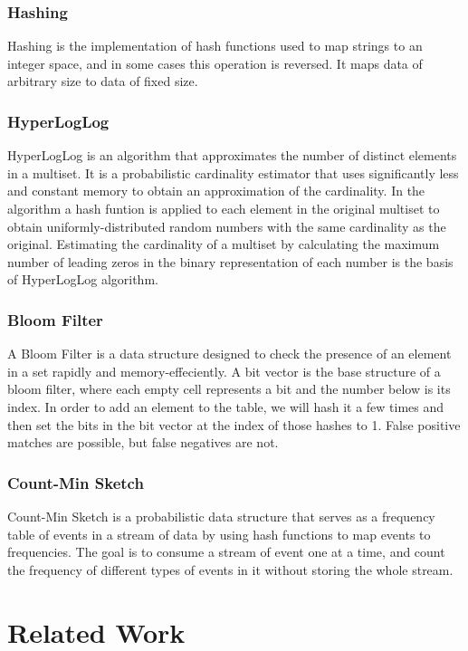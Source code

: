 \documentclass[preprint,nocopyrightspace]{sig-alternate}
\begin{document}
\subsubsection{Hashing}
Hashing is the implementation of hash functions used to map strings to an integer space, and in some cases this operation is reversed. It maps data of arbitrary size to data of fixed size.

\subsubsection{HyperLogLog}
HyperLogLog is an algorithm that approximates the number of distinct elements in a multiset. It is a probabilistic cardinality estimator that uses significantly less and constant memory to obtain an approximation of the cardinality. In the algorithm a hash funtion is applied to each element in the original multiset to obtain uniformly-distributed random numbers with the same cardinality as the original. Estimating the cardinality of a multiset by calculating the maximum number of leading zeros in the binary representation of each number is the basis of HyperLogLog algorithm.

\subsubsection{Bloom Filter}
A Bloom Filter is a data structure designed to check the presence of an element in a set rapidly and memory-effeciently. A bit vector is the base structure of a bloom filter, where each empty cell represents a bit and the number below is its index. In order to add an element to the table, we will hash it a few times and then set the bits in the bit vector at the index of those hashes to 1. False positive matches are possible, but false negatives are not.

\subsubsection{Count-Min Sketch}
Count-Min Sketch is a probabilistic data structure that serves as a frequency table of events in a stream of data by using hash functions to map events to frequencies. The goal is to consume a stream of event one at a time, and count the frequency of different types of events in it without storing the whole stream.

\section{Related Work}
\end{document}
